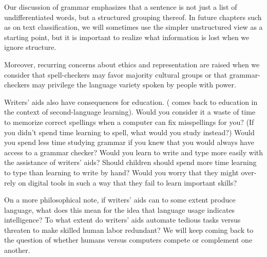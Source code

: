 Our discussion of grammar emphasizes that a sentence is not just a list of undifferentiated words, but a structured grouping thereof.  In future chapters such as  on text classification, we will sometimes use the simpler unstructured view as a starting point, but it is important to realize what information is lost when we ignore structure.

Moreover, recurring concerns about ethics and representation are
raised when we consider that spell-checkers may favor majority
cultural groups or that gram\-mar-checkers may privilege the language
variety spoken by people with power.

Writers' aids also have consequences for education. ( comes back to education in the context of second-language learning). Would you consider it a waste of time to memorize correct spellings when a computer can fix misspellings for you? (If you didn't spend time learning to spell, what would you study instead?)  Would you spend less time studying grammar if you knew that you would always have access to a grammar checker? Would you learn to write and type more easily with the assistance of writers' aids?   Should children should spend more time learning to type than learning to write by hand? Would you  worry that they might over-rely on digital tools in such a way that they fail to learn important skills?

 

On a more philosophical note, if writers' aids can to some extent produce  language, what does this mean for the idea that language usage indicates  intelligence?  To what extent do writers' aids automate tedious tasks versus threaten to make skilled human labor redundant?  We will keep coming back to the question of whether humans versus computers compete or complement one another.





